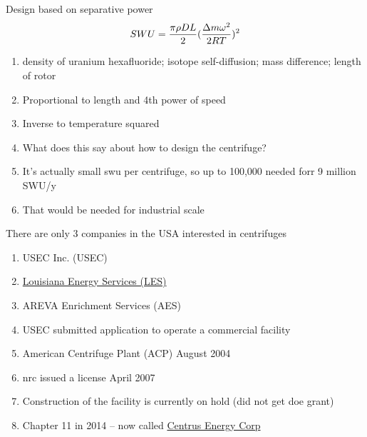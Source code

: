 \documentclass[aspectratio=1610,pdftex,dvipsnames,compress,xcolor={dvipsnames}]{beamer}
\newcommand{\acs}{\acrshort} %
\begin{document}
\begin{frame}{Design based on separative power}
    \begin{equation}
        \LARGE
        SWU = \frac{\pi \rho DL}{2}(\frac{\Delta m \omega^2}{2RT})^2
    \end{equation}
    
    \vspace*{\fill}

    \begin{enumerate}[topsep=0pt,itemsep=21pt,leftmargin=*,label=(\arabic*)]
        \item[]density of uranium hexafluoride; isotope self-diffusion; mass difference; length of rotor
        \item[]Proportional to length and 4th power of speed
        \item[]Inverse to temperature squared
        \item[]What does this say about how to design the centrifuge?
        \item[]It's actually small \acs{swu} per centrifuge, so up to 100,000 needed forr 9 million SWU/y
        \item[]That would be needed for industrial scale
    \end{enumerate}
\end{frame}


\begin{frame}{There are only 3 companies in the USA interested in centrifuges}
    \begin{enumerate}[topsep=0pt,itemsep=15pt,leftmargin=*,label=(\arabic*)]
        \item[]USEC Inc. (USEC)
        \item[]\href{https://www.nirs.org/les/}{Louisiana Energy Services (LES)}
        \item[]AREVA Enrichment Services (AES)
        \item[]USEC submitted application to operate a commercial facility
        \item[]American Centrifuge Plant (ACP) August 2004
        \item[]\acs{nrc} issued a license April 2007 
        \item[]Construction of the facility is currently on hold (did not get \acs{doe} grant)
        \item[]Chapter 11 in 2014 -- now called \href{http://www.centrusenergy.com/}{Centrus Energy Corp}
    \end{enumerate}
\end{frame}
\end{document}
